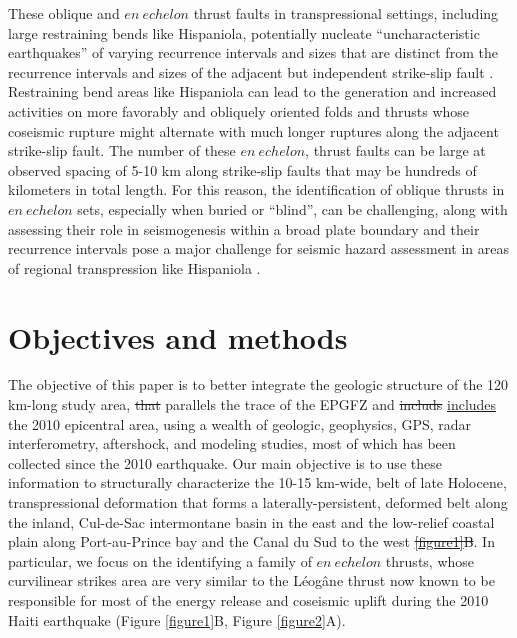 \documentclass[linenumbers,draft]{agujournal}
\providecommand{\DIFadd}[1]{{\protect\color{blue}\uwave{#1}}} %
\providecommand{\DIFdel}[1]{{\protect\color{red}\sout{#1}}}                      %
\providecommand{\DIFaddbegin}{} %
\providecommand{\DIFaddend}{} %
\providecommand{\DIFdelbegin}{} %
\providecommand{\DIFdelend}{} %
\begin{document}
These oblique and $en~echelon$ thrust faults in transpressional settings, including large restraining bends like Hispaniola, potentially nucleate ``uncharacteristic earthquakes'' of varying recurrence intervals and sizes that are distinct from the recurrence intervals and sizes of the adjacent but independent strike-slip fault \citep{Fielding2013}. Restraining bend areas like Hispaniola can lead to the generation and increased activities on more favorably and obliquely oriented folds and thrusts whose coseismic rupture might alternate with much longer ruptures along the adjacent strike-slip fault. The number of these $en~echelon$, thrust faults can be large at observed spacing of 5-10 km along strike-slip faults that may be hundreds of kilometers in total length. For this reason, the identification of oblique thrusts in $en~echelon$ sets, especially when buried or ``blind'', can be challenging, along with assessing their role in seismogenesis within a broad plate boundary and their recurrence intervals pose a major challenge for seismic hazard assessment in areas of regional transpression like Hispaniola \citep{frankel2011seismic}.

\section{Objectives and methods}
The objective of this paper is to better integrate the geologic structure of the 120 km-long study area, \DIFdelbegin \DIFdel{that }\DIFdelend \DIFaddbegin \DIFadd{which }\DIFaddend parallels the trace of the EPGFZ and \DIFdelbegin \DIFdel{includs }\DIFdelend \DIFaddbegin \ul{includes} \DIFaddend the 2010 epicentral area, using a wealth of geologic, geophysics, GPS, radar interferometry, aftershock, and modeling studies, most of which has been collected since the 2010 earthquake. Our main objective is to use these information to structurally characterize the 10-15 km-wide, belt of late Holocene, transpressional deformation that forms a laterally-persistent, deformed belt along the inland, Cul-de-Sac intermontane basin in the east and the low-relief coastal plain along Port-au-Prince bay and the Canal du Sud to the west \DIFdelbegin \DIFdel{\ref{figure1}B}\DIFdelend \DIFaddbegin \underline{\DIFadd{(Figure~\ref{figure1}B)}}\DIFaddend . In particular, we focus on the identifying a family of $en~echelon$ thrusts, whose curvilinear strikes area are very similar to the L\'eog\^ane thrust now known to be responsible for most of the energy release and coseismic uplift during the 2010 Haiti earthquake \citep{calais2010transpressional,douilly2013crustal,douilly2015three} (Figure \ref{figure1}B, Figure \ref{figure2}A).
\end{document}
